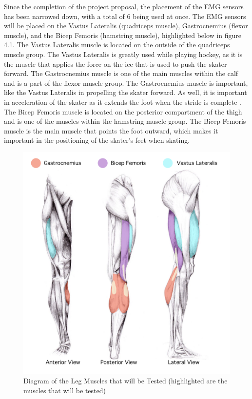 Since the completion of the project proposal, the placement of the EMG sensors has been narrowed down, with a total of 6 being used at once.  The EMG sensors will be placed on the Vastus Lateralis (quadriceps muscle), Gastrocnemius (flexor muscle), and the Bicep Femoris (hamstring muscle), highlighted below in figure 4.1\cite{1}. The Vastus Lateralis  muscle is located on the outside of the quadriceps muscle group. The Vastus Lateralis is greatly used while playing hockey, as it is the muscle that applies the force on the ice that is used to push the skater forward\cite{2}. The Gastrocnemius muscle is one of the main muscles within the calf and is a part of the flexor muscle group. The Gastrocnemius muscle is important, like the Vastus Lateralis in propelling the skater forward. As well, it is important in acceleration of the skater as it extends the foot when the stride is complete \cite{2}. The Bicep Femoris muscle is located on the posterior compartment of the thigh and is one of the muscles within the hamstring muscle group. The Bicep Femoris muscle is the main muscle that points the foot outward, which makes it important in the positioning of the skater's feet when skating\cite{2}. 
\par
\begin{figure}[htb]
\centering
\includegraphics[scale=0.5]{Progress_Report/figs/highlightedmuscles.png}
\caption{Diagram of the Leg Muscles that will be Tested (highlighted are the muscles that will be tested)\cite{3}}
\label{fig:Muscles}
\end{figure}
\par



